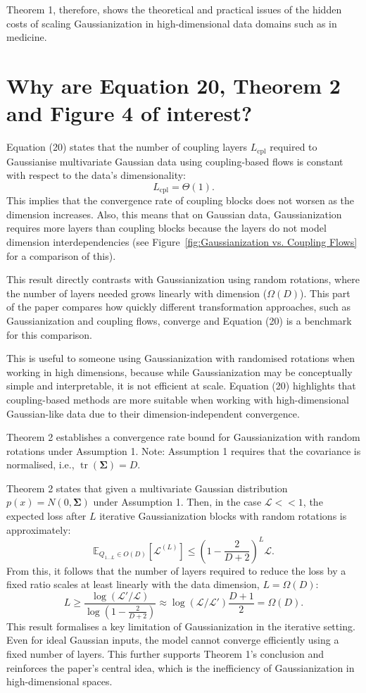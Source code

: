 \documentclass[11pt]{report} %
\begin{document}
\noindent Theorem 1, therefore, shows the theoretical and practical issues of the hidden costs of scaling Gaussianization in high-dimensional data domains such as in medicine.

\section{Why are Equation 20, Theorem 2 and Figure 4 of interest?}

Equation (20) states that the number of coupling layers \( L_{\mathrm{cpl}} \) required to Gaussianise multivariate Gaussian data using coupling-based flows is constant with respect to the data's dimensionality:
\[
L_{\mathrm{cpl}} = \Theta(1).
\tag{20}
\]
This implies that the convergence rate of coupling blocks does not worsen as the dimension increases. Also, this means that on Gaussian data, Gaussianization requires more layers than coupling blocks because the
layers do not model dimension interdependencies (see Figure~\ref{fig:Gaussianization vs. Coupling Flows} for a comparison of this).

This result directly contrasts with Gaussianization using random rotations, where the number of layers needed grows linearly with dimension (\( \Omega(D) \)). This part of the paper compares how quickly different transformation approaches, such as Gaussianization and coupling flows, converge and Equation (20) is a benchmark for this comparison.

This is useful to someone using Gaussianization with randomised rotations when working in high dimensions, because while Gaussianization may be conceptually simple and interpretable, it is not efficient at scale. Equation (20) highlights that coupling-based methods are more suitable when working with high-dimensional Gaussian-like data due to their dimension-independent convergence.


Theorem 2 establishes a convergence rate bound for Gaussianization with random rotations under Assumption 1. 
Note: Assumption 1 requires that the covariance is normalised, i.e., \( \operatorname{tr} (\mathbf{\Sigma}) = D \).

Theorem 2 states that given a multivariate Gaussian distribution
$p(x) = N (0, \mathbf{\Sigma})$ under Assumption 1. Then, in the case $\mathcal{L} << 1$, the expected loss after $L$ iterative Gaussianization blocks with random rotations is approximately:
\[
\mathbb{E}_{Q_{1\dots L}\in O(D)}[\mathcal{L}^{(L)}] \leq \left(1 - \frac{2}{D + 2} \right)^L \mathcal{L}.
\]
From this, it follows that the number of layers required to reduce the loss by a fixed ratio scales at least linearly with the data dimension, $L = \Omega(D)$:
\[
L \geq \frac{\log(\mathcal{L}' / \mathcal{L})}{\log\left(1 - \frac{2}{D + 2}\right)} 
\approx \log(\mathcal{L} / \mathcal{L}')\frac{D + 1}{2} = \Omega(D).
\]
This result formalises a key limitation of Gaussianization in the iterative setting. Even for ideal Gaussian inputs, the model cannot converge efficiently using a fixed number of layers. This further supports Theorem 1's conclusion and reinforces the paper's central idea, which is the inefficiency of Gaussianization in high-dimensional spaces.
\end{document}
